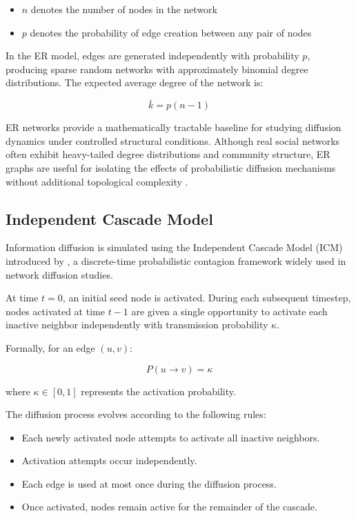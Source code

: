 \documentclass{article}
\begin{document}
\begin{itemize}
    \item $n$ denotes the number of nodes in the network
    \item $p$ denotes the probability of edge creation between any pair of nodes
\end{itemize}

In the ER model, edges are generated independently with probability $p$, producing sparse random networks with approximately binomial degree distributions. The expected average degree of the network is:

\[
\bar{k} = p(n-1)
\]

ER networks provide a mathematically tractable baseline for studying diffusion dynamics under controlled structural conditions. Although real social networks often exhibit heavy-tailed degree distributions and community structure, ER graphs are useful for isolating the effects of probabilistic diffusion mechanisms without additional topological complexity \citep{watts2002simple}.

\subsection{Independent Cascade Model}

Information diffusion is simulated using the Independent Cascade Model (ICM) introduced by \citet{kempe2003maximizing}, a discrete-time probabilistic contagion framework widely used in network diffusion studies.

At time $t=0$, an initial seed node is activated. During each subsequent timestep, nodes activated at time $t-1$ are given a single opportunity to activate each inactive neighbor independently with transmission probability $\kappa$.

Formally, for an edge $(u,v)$:

\[
P(u \rightarrow v) = \kappa
\]

where $\kappa \in [0,1]$ represents the activation probability.

The diffusion process evolves according to the following rules:

\begin{itemize}
    \item Each newly activated node attempts to activate all inactive neighbors.
    \item Activation attempts occur independently.
    \item Each edge is used at most once during the diffusion process.
    \item Once activated, nodes remain active for the remainder of the cascade.
\end{itemize}
\end{document}
